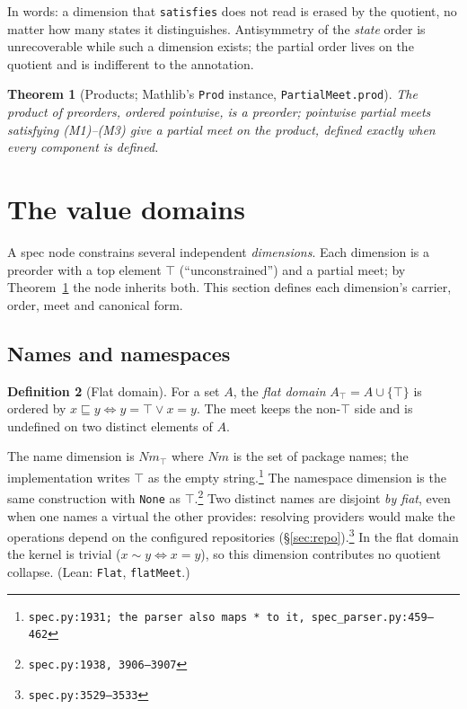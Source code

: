 \documentclass[11pt]{article}
\newtheorem{theorem}{Theorem}[section]
\theoremstyle{definition}
\newtheorem{definition}[theorem]{Definition}
\theoremstyle{remark}
\renewcommand{\ker}{\sim}
\newcommand{\Names}{\mathit{Nm}}
\newcommand{\code}[1]{\texttt{#1}}
\newcommand{\src}[1]{\footnote{\code{#1}}}
\begin{document}
In words: a dimension that \code{satisfies} does not read is erased by the
quotient, no matter how many states it distinguishes.  Antisymmetry of the
\emph{state} order is unrecoverable while such a dimension exists; the partial
order lives on the quotient and is indifferent to the annotation.

\begin{theorem}[Products; Mathlib's \code{Prod} instance,
\code{PartialMeet.prod}]\label{thm:prod}
The product of preorders, ordered pointwise, is a preorder; pointwise partial
meets satisfying (M1)--(M3) give a partial meet on the product, defined
exactly when every component is defined.
\end{theorem}

\section{The value domains}\label{sec:dimensions}

A spec node constrains several independent \emph{dimensions}.  Each dimension
is a preorder with a top element $\top$ (``unconstrained'') and a partial meet;
by Theorem~\ref{thm:prod} the node inherits both.  This section defines each
dimension's carrier, order, meet and canonical form.

\subsection{Names and namespaces}\label{sec:names}

\begin{definition}[Flat domain]
For a set $A$, the \emph{flat domain} $A_\top = A \cup \{\top\}$ is ordered by
$x \sqsubseteq y \iff y = \top \vee x = y$.  The meet keeps the non-$\top$
side and is undefined on two distinct elements of $A$.
\end{definition}

The name dimension is $\Names_\top$ where $\Names$ is the set of package
names; the implementation writes $\top$ as the empty string.\src{spec.py:1931;
the parser also maps \code{*} to it, spec\_parser.py:459--462}  The namespace
dimension is the same construction with \code{None} as
$\top$.\src{spec.py:1938, 3906--3907}  Two distinct names are disjoint
\emph{by fiat}, even when one names a virtual the other provides: resolving
providers would make the operations depend on the configured repositories
(\S\ref{sec:repo}).\src{spec.py:3529--3533}  In the flat domain the kernel is
trivial ($x \ker y \iff x = y$), so this dimension contributes no quotient
collapse.  (Lean: \code{Flat}, \code{flatMeet}.)
\end{document}

